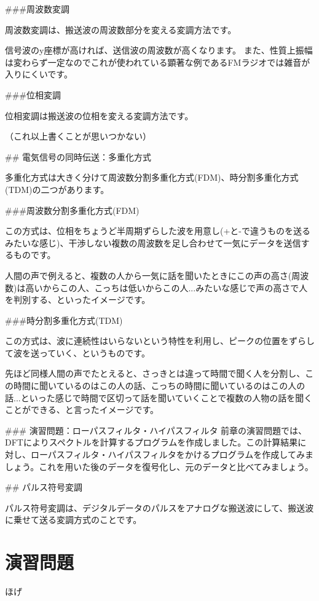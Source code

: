 ###周波数変調

周波数変調は、搬送波の周波数部分を変える変調方法です。

信号波のy座標が高ければ、送信波の周波数が高くなります。
また、性質上振幅は変わらず一定なのでこれが使われている顕著な例であるFMラジオでは雑音が入りにくいです。

###位相変調

位相変調は搬送波の位相を変える変調方法です。

（これ以上書くことが思いつかない）

## 電気信号の同時伝送：多重化方式

多重化方式は大きく分けて周波数分割多重化方式(FDM)、時分割多重化方式(TDM)の二つがあります。

###周波数分割多重化方式(FDM)

この方式は、位相をちょうど半周期ずらした波を用意し(+と-で違うものを送るみたいな感じ)、干渉しない複数の周波数を足し合わせて一気にデータを送信するものです。

人間の声で例えると、複数の人から一気に話を聞いたときにこの声の高さ(周波数)は高いからこの人、こっちは低いからこの人...みたいな感じで声の高さで人を判別する、といったイメージです。

###時分割多重化方式(TDM)

この方式は、波に連続性はいらないという特性を利用し、ピークの位置をずらして波を送っていく、というものです。

先ほど同様人間の声でたとえると、さっきとは違って時間で聞く人を分割し、この時間に聞いているのはこの人の話、こっちの時間に聞いているのはこの人の話...といった感じで時間で区切って話を聞いていくことで複数の人物の話を聞くことができる、と言ったイメージです。

### 演習問題：ローパスフィルタ・ハイパスフィルタ
前章の演習問題では、DFTによりスペクトルを計算するプログラムを作成しました。この計算結果に対し、ローパスフィルタ・ハイパスフィルタをかけるプログラムを作成してみましょう。これを用いた後のデータを復号化し、元のデータと比べてみましょう。

## パルス符号変調

パルス符号変調は、デジタルデータのパルスをアナログな搬送波にして、搬送波に乗せて送る変調方式のことです。

\section{}

\section*{演習問題}
\begin{problems}
\item ほげ
\end{problems}

